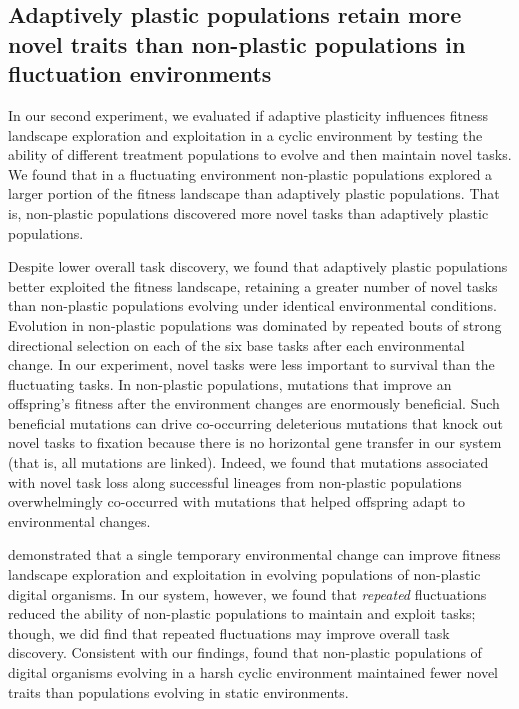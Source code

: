 \vspace{0.25cm}
\subsection{Adaptively plastic populations retain more novel traits than non-plastic populations in fluctuation environments}

In our second experiment, we evaluated if adaptive plasticity influences fitness landscape exploration and exploitation in a cyclic environment by testing the ability of different treatment populations to evolve and then maintain novel tasks.
We found that in a fluctuating environment non-plastic populations explored a larger portion of the fitness landscape than adaptively plastic populations.
That is, non-plastic populations discovered more novel tasks than adaptively plastic populations.

Despite lower overall task discovery, we found that adaptively plastic populations better exploited the fitness landscape, retaining a greater number of novel tasks than non-plastic populations evolving under identical environmental conditions.
Evolution in non-plastic populations was dominated by repeated bouts of strong directional selection on each of the six base tasks after each environmental change. 
In our experiment, novel tasks were less important to survival than the fluctuating tasks.
In non-plastic populations, mutations that improve an offspring's fitness after the environment changes are enormously beneficial. 
Such beneficial mutations can drive co-occurring deleterious mutations that knock out novel tasks to fixation because there is no horizontal gene transfer in our system (that is, all mutations are linked).
Indeed, we found that mutations associated with novel task loss along successful lineages from non-plastic populations overwhelmingly co-occurred with mutations that helped offspring adapt to environmental changes.

\cite{nahum_improved_2017} demonstrated that a single temporary environmental change can improve fitness landscape exploration and exploitation in evolving populations of non-plastic digital organisms.
In our system, however, we found that \textit{repeated} fluctuations reduced the ability of non-plastic populations to maintain and exploit tasks; though, we did find that repeated fluctuations may improve overall task discovery. 
Consistent with our findings, \cite{canino-koning_fluctuating_2019} found that non-plastic populations of digital organisms evolving in a harsh cyclic environment maintained fewer novel traits than populations evolving in static environments.

